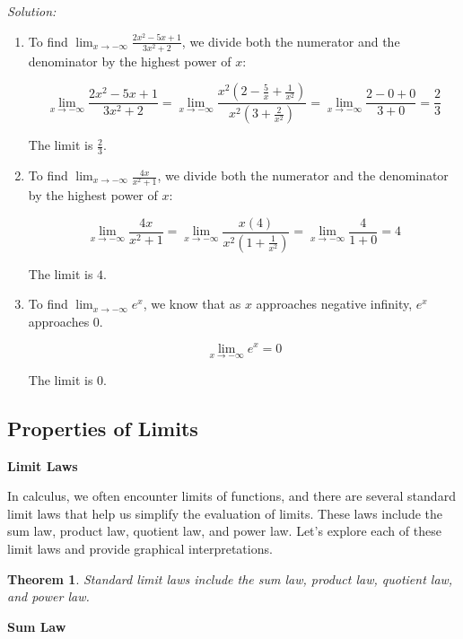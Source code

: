 \documentclass[a4paper,12pt]{book}
\newenvironment{solution}[1][]
{\par\noindent\textit{Solution:} \rmfamily}{\medskip}
\newtheorem{theorem}{Theorem}
\begin{document}
\begin{solution}
\begin{enumerate}[label=(\alph*)]
  \item To find \( \lim_{{x \to -\infty}} \frac{2x^2 - 5x + 1}{3x^2 + 2} \), we divide both the numerator and the denominator by the highest power of \( x \):
  
  \[
  \lim_{{x \to -\infty}} \frac{2x^2 - 5x + 1}{3x^2 + 2} = \lim_{{x \to -\infty}} \frac{x^2(2 - \frac{5}{x} + \frac{1}{x^2})}{x^2(3 + \frac{2}{x^2})} = \lim_{{x \to -\infty}} \frac{2 - 0 + 0}{3 + 0} = \frac{2}{3}
  \]
  
  The limit is \( \frac{2}{3} \).
  
  \item To find \( \lim_{{x \to -\infty}} \frac{4x}{x^2 + 1} \), we divide both the numerator and the denominator by the highest power of \( x \):
  
  \[
  \lim_{{x \to -\infty}} \frac{4x}{x^2 + 1} = \lim_{{x \to -\infty}} \frac{x(4)}{x^2(1 + \frac{1}{x^2})} = \lim_{{x \to -\infty}} \frac{4}{1 + 0} = 4
  \]
  
  The limit is \( 4 \).
  
  \item To find \( \lim_{{x \to -\infty}} e^x \), we know that as \( x \) approaches negative infinity, \( e^x \) approaches \( 0 \).
  
  \[
  \lim_{{x \to -\infty}} e^x = 0
  \]
  
  The limit is \( 0 \).
\end{enumerate}
\end{solution}


\subsection{Properties of Limits}

\textbf{Limit Laws}

In calculus, we often encounter limits of functions, and there are several standard limit laws that help us simplify the evaluation of limits. These laws include the sum law, product law, quotient law, and power law. Let's explore each of these limit laws and provide graphical interpretations.

\begin{theorem}
Standard limit laws include the sum law, product law, quotient law, and power law.
\end{theorem}

\textbf{Sum Law}
\end{document}
